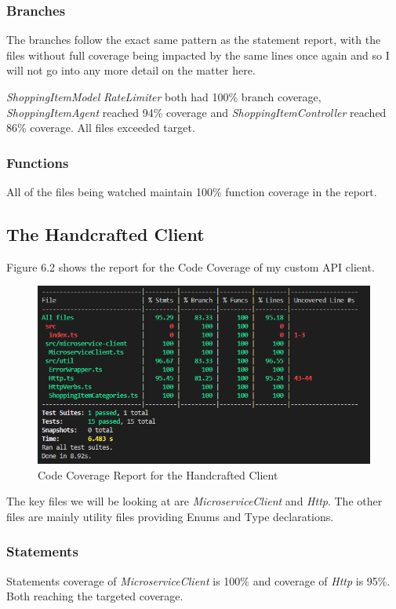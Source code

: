 \subsubsection{Branches}
The branches follow the exact same pattern as the statement report, with the files without full coverage being impacted by the same lines once again and so I will not go into any more detail on the matter here.

\textit{ShoppingItemModel} \textit{RateLimiter} both had 100\% branch coverage, \textit{ShoppingItemAgent} reached 94\% coverage and \textit{ShoppingItemController} reached 86\% coverage. All files exceeded target.

\subsubsection{Functions}
All of the files being watched maintain 100\% function coverage in the report.
\subsection{The Handcrafted Client}
Figure 6.2 shows the report for the Code Coverage of my custom API client.
\begin{figure}[!htb]
\caption{Code Coverage Report for the Handcrafted Client}
\centering
\includegraphics[scale=0.70]{FYP_Dissertation_template/Figures/handcrafted-client-code-coverage.PNG}
\end{figure}
\FloatBarrier

The key files we will be looking at are \textit{MicroserviceClient} and \textit{Http}. The other files are mainly utility files providing Enums and Type declarations.
\subsubsection{Statements}
Statements coverage of \textit{MicroserviceClient} is 100\% and coverage of \textit{Http} is 95\%. Both reaching the targeted coverage.

